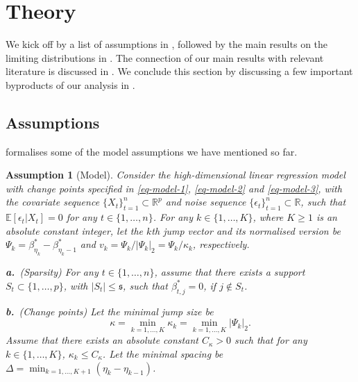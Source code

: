 \documentclass[11pt]{article}
\theoremstyle{plain}
\newtheorem{assumption}{Assumption}
\theoremstyle{definition}
\begin{document}
\section{Theory}\label{sec:theory}

We kick off by a list of assumptions in , followed by the main results on the limiting distributions in .  The connection of our main results with relevant literature is discussed in .  We conclude this section by discussing a few important byproducts of our analysis in .


\subsection{Assumptions}\label{sec:assumptions}

 formalises some of the model assumptions we have mentioned so far. 

\begin{assumption}[Model] \label{assume:regression parameters} 
Consider the high-dimensional linear regression model with change points specified in \eqref{eq-model-1}, \eqref{eq-model-2} and \eqref{eq-model-3}, with the covariate sequence $\{X_t\}_{t = 1}^n \subset \mathbb{R}^p$ and noise sequence $\{\epsilon_t\}_{t = 1}^n \subset \mathbb{R}$, such that $\mathbb E[\epsilon_t|X_t] = 0$ for any $t \in \{1, \dots, n\}$.  For any $k \in \{1, \dots, K\}$, where $K \geq 1$ is an absolute constant integer, let the $k$th jump vector and its normalised version be $\Psi_k = \beta_{\eta_k}^* - \beta_{\eta_k-1}^*$ and $v_k = \Psi_k/|\Psi_k|_2 =  \Psi_k/\kappa_k$, respectively.

\noindent \textbf{a.}~(Sparsity) For any $t \in \{1, \ldots, n\}$, assume that there exists a support $S_t \subset \{1, \ldots, p\}$, with $|S_t|\le \mathfrak{s}$, such that $\beta^*_{t, j} = 0$, if $j \not \in S_t$.

\noindent \textbf{b.}~(Change points) Let the minimal jump size be
\begin{equation}\label{eq-kappa-def}
    \kappa = \min_{k = 1, \ldots, K} \kappa_k = \min_{k = 1, \ldots, K} |\Psi_k|_2. 
\end{equation}
Assume that there exists an absolute constant $C_\kappa > 0$ such that for any $k\in \{1,\ldots, K \}$, $\kappa_k \le C_\kappa$.  Let the minimal spacing be $\Delta = \min_{k = 1, \ldots, K+1}(\eta_{k} - \eta_{k-1})$.
\end{assumption} 
\end{document}
